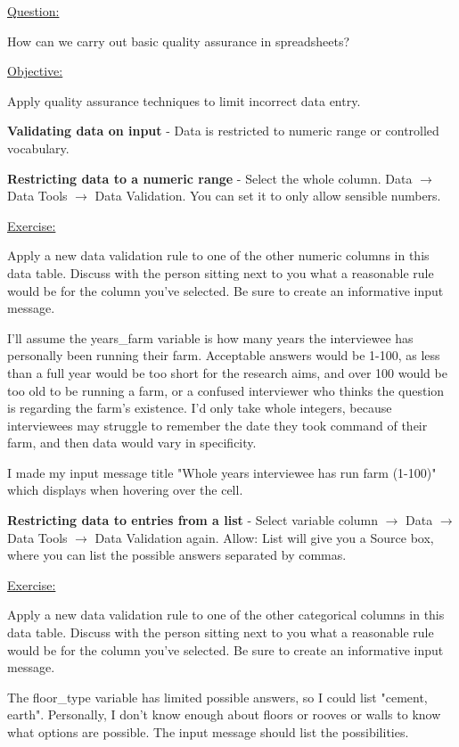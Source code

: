 \documentclass[12pt]{article}
\begin{document}
\color{gray}
\underline{Question:}

How can we carry out basic quality assurance in spreadsheets?

\underline{Objective:}

Apply quality assurance techniques to limit incorrect data entry.
\color{black}

\vspace{1em}
\textbf{Validating data on input} - Data is restricted to numeric range or controlled vocabulary.

\textbf{Restricting data to a numeric range} - Select the whole column. Data $\rightarrow$ Data Tools $\rightarrow$ Data Validation. You can set it to only allow sensible numbers.

\vspace{1em}
\color{gray}\begin{addmargin}[1cm]{0cm}
\underline{Exercise:}

Apply a new data validation rule to one of the other numeric columns in this data table. Discuss with the person sitting next to you what a reasonable rule would be for the column you’ve selected. Be sure to create an informative input message.


\color{black}
I'll assume the years\_farm variable is how many years the interviewee has personally been running their farm. Acceptable answers would be 1-100, as less than a full year would be too short for the research aims, and over 100 would be too old to be running a farm, or a confused interviewer who thinks the question is regarding the farm's existence. I'd only take whole integers, because interviewees may struggle to remember the date they took command of their farm, and then data would vary in specificity.

I made my input message title "Whole years interviewee has run farm (1-100)" which displays when hovering over the cell.
\end{addmargin}

\vspace{1em}
\color{black}
\textbf{Restricting data to entries from a list} - Select variable column $\rightarrow$ Data $\rightarrow$ Data Tools $\rightarrow$ Data Validation again. Allow: List will give you a Source box, where you can list the possible answers separated by commas.

\vspace{1em}
\color{gray}\begin{addmargin}[1cm]{0cm}
\underline{Exercise:}

Apply a new data validation rule to one of the other categorical columns in this data table. Discuss with the person sitting next to you what a reasonable rule would be for the column you’ve selected. Be sure to create an informative input message.

\color{black}
The floor\_type variable has limited possible answers, so I could list "cement, earth". Personally, I don't know enough about floors or rooves or walls to know what options are possible. The input message should list the possibilities.
\end{addmargin}
\end{document}
